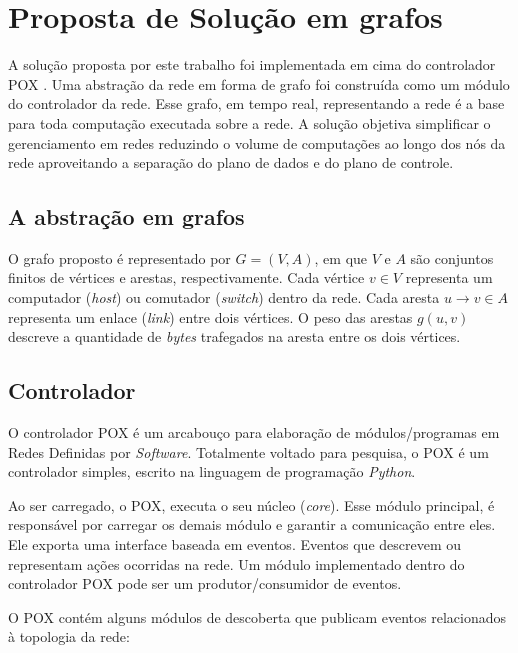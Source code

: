 \chapter{Proposta de Solução em grafos}

A solução proposta por este trabalho foi implementada em cima do controlador
POX \citep{pox2015}. 
Uma abstração da rede em forma de grafo foi construída como um módulo 
do controlador da rede.
Esse grafo, em tempo real, representando a rede é a base para toda computação
executada sobre a rede.
A solução objetiva simplificar o gerenciamento em redes reduzindo o volume 
de computações ao longo dos nós da rede aproveitando a separação do plano 
de dados e do plano de controle.

\section{A abstração em grafos}

O grafo proposto é representado por $G=(V, A)$, em que $V$ e $A$ são conjuntos
finitos de vértices e arestas, respectivamente.
Cada vértice $v \in V$ representa um computador (\emph{host}) ou comutador
(\emph{switch}) dentro da rede.
Cada aresta $u \to v \in A$ representa um enlace (\emph{link}) entre dois
vértices.
O peso das arestas $g(u, v)$ descreve a quantidade de \emph{bytes} trafegados
na aresta entre os dois vértices.

\section{Controlador}
\label{sec:controller}

O controlador POX é um arcabouço para elaboração de módulos/programas 
em Redes Definidas por \emph{Software}.
Totalmente voltado para pesquisa, o POX é um controlador simples, 
escrito na linguagem de programação \emph{Python}.

Ao ser carregado, o POX, executa o seu núcleo (\emph{core}). 
Esse módulo principal, é responsável por carregar os demais 
módulo e garantir a comunicação entre eles.
Ele exporta uma interface baseada em eventos. 
Eventos que descrevem ou representam ações ocorridas na rede.
Um módulo implementado dentro do controlador POX pode ser um 
produtor/consumidor de eventos.

O POX contém alguns módulos de descoberta que publicam eventos relacionados
à topologia da rede:

